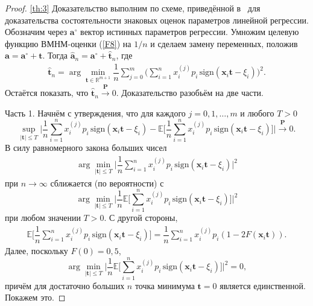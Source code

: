 \begin{proof}{\ref{th:3}}
Доказательство выполним по схеме, приведённой в~{\cite[c.~81--85]{fourth}} для доказательства состоятельности
знаковых оценок параметров линейной регрессии. Обозначим через
$\mathbf{a}^{\circ}$  вектор истинных параметров регрессии.
Умножим целевую функцию ВМНМ-оценки (\ref{F8}) на $1/n$ и
сделаем замену переменных, положив $\mathbf{a} =
\mathbf{a}^{\circ} + \mathbf{t}$. Тогда $\mathbf{\hat{a}}_{n} =
\mathbf{a}^{\circ} + \mathbf{\hat{t}}_{n}$, где
\begin{gather} \label{P1}
\mathbf{\hat{t}}_{n}=\arg\min _{\mathbf{t} \in \mathbb{R}^{m+1}}
\dfrac 1n \sum_{j=0}^m \biggl (\sum_{i=1}^n x_{i}^{(j)}p_{i} \,
\mathrm{sign}\left(\mathbf{x}_{i}\mathbf{t}-\xi_{i}\right)\biggr)^{2}.
\end{gather}
Остаётся показать, что
$\mathbf{\hat{t}}_{n}\stackrel{\mathbf{P}}{\longrightarrow}0$.
Доказательство разобьём на две части.

Часть 1. Начнём с утверждения, что для каждого $j= 0, 1,\ldots, m$ и любого
$T>0$  $$\sup_{\left|\mathbf{t}\right| \leq T} 
\biggl| \dfrac 1n
\sum_{i=1}^n x_{i}^{(j)}p_{i} \,
\mathrm{sign}\left(\mathbf{x}_{i}\mathbf{t}-\xi_{i}\right) -
\mathbb{E}\biggl[\dfrac 1n \sum_{i=1}^n x_{i}^{(j)}p_{i} \,
\mathrm{sign}\left(\mathbf{x}_{i}\mathbf{t}-\xi_{i}\right)\biggr]
\biggr| \stackrel{\mathbf{P}}{\longrightarrow}0.$$ 
В силу равномерного закона больших чисел \ {\cite[c.~90--94]{fourth}}
\begin{gather} \label{P2}
	\arg\min_{\left|\mathbf{t}\right| \leq T} \biggl| \dfrac 1n
	\sum_{i=1}^n x_{i}^{(j)}p_{i} \,
	\mathrm{sign}\left(\mathbf{x}_{i}\mathbf{t}-\xi_{i}\right)\biggr|^{2}
\end{gather}
при $n \rightarrow \infty$ сближается (по вероятности) с
$$\arg\min_{\left|\mathbf{t}\right| \leq T} 
\biggl| \dfrac 1n
\mathbb{E}\bigg[\sum_{i=1}^n x_{i}^{(j)}p_{i} \,
\mathrm{sign}\left(\mathbf{x}_{i}\mathbf{t}-\xi_{i}\right)\biggr]\biggr|^{2}$$
при любом значении $T>0$. С другой стороны,
\begin{gather} \label{P3}
\mathbb{E}\biggl[\dfrac 1n\sum_{i=1}^n x_{i}^{(j)}p_{i} \,
\mathrm{sign}\left(\mathbf{x}_{i}\mathbf{t}-\xi_{i}\right)\biggr]
= \dfrac 1n\sum_{i=1}^n
x_{i}^{(j)}p_{i}(1-2F(\mathbf{x}_{i}\mathbf{t})).
\end{gather}
Далее, поскольку $F(0)=0,5$, 
$$\arg\min_{\left|\mathbf{t}\right| \leq T}
 \biggl| \dfrac 1n
\mathbb{E}\biggl[\sum_{i=1}^n x_{i}^{(j)}p_{i} \,
\mathrm{sign}\left(\mathbf{x}_{i}\mathbf{t}-\xi_{i}\right)\biggr]\biggr|^{2}=0,$$
причём для достаточно больших $n$ точка минимума $\mathbf{t}=0$
является единственной. Покажем это.


\end{proof}
